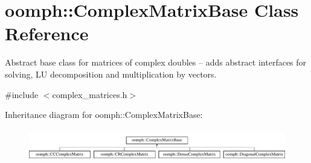 \hypertarget{classoomph_1_1ComplexMatrixBase}{}\section{oomph\+:\+:Complex\+Matrix\+Base Class Reference}
\label{classoomph_1_1ComplexMatrixBase}


Abstract base class for matrices of complex doubles -- adds abstract interfaces for solving, LU decomposition and multiplication by vectors.  




{\ttfamily \#include $<$complex\+\_\+matrices.\+h$>$}

Inheritance diagram for oomph\+:\+:Complex\+Matrix\+Base\+:\begin{figure}[H]
\begin{center}
\leavevmode
\includegraphics[height=1.428571cm]{classoomph_1_1ComplexMatrixBase}
\end{center}
\end{figure}
